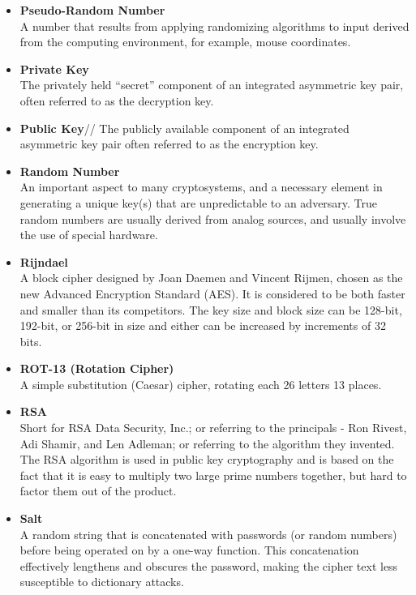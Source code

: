 \begin{itemize}
\item \textbf{Pseudo-Random Number}\\
A number that results from applying randomizing algorithms to input derived from the computing environment, for example, mouse coordinates.

\item \textbf{Private Key}\\
The privately held “secret” component of an integrated asymmetric key pair, often referred to as the decryption key.

\item \textbf{Public Key}//
The publicly available component of an integrated asymmetric key pair often
referred to as the encryption key.

\item \textbf{Random Number}\\
An important aspect to many cryptosystems, and a necessary element in generating a unique key(s) that are unpredictable to an adversary. True random numbers are usually derived from analog sources, and usually involve the use of special hardware.

\item \textbf{Rijndael}\\
A block cipher designed by Joan Daemen and Vincent Rijmen, chosen as the new Advanced Encryption Standard (AES). It is considered to be both faster and smaller than its competitors. The key size and block size can be 128-bit, 192-bit, or 256-bit in size and either can be increased by increments of 32 bits.

\item \textbf{ROT-13 (Rotation Cipher)}\\
A simple substitution (Caesar) cipher, rotating each 26 letters 13 places.

\item \textbf{RSA}\\
Short for RSA Data Security, Inc.; or referring to the principals - Ron Rivest, Adi Shamir, and Len Adleman; or referring to the algorithm they invented. The RSA algorithm is used in public key cryptography and is based on the fact that it is easy to multiply two large prime numbers together, but hard to factor them out of the product.

\item \textbf{Salt}\\
A random string that is concatenated with passwords (or random numbers) before being operated on by a one-way function. This concatenation effectively lengthens and obscures the password, making the cipher text less susceptible to dictionary attacks.


\end{itemize}
